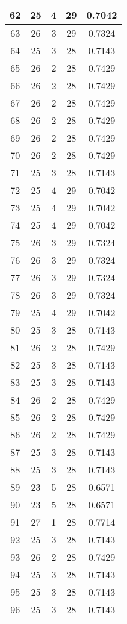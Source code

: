 \documentclass[letterpaper, 12pt]{article}
\begin{document}
\begin{longtable}{|c|c|c|c|c|}
\hline
62 & 25 & 4 & 29 & 0.7042 \\
\hline
63 & 26 & 3 & 29 & 0.7324 \\
\hline
64 & 25 & 3 & 28 & 0.7143 \\
\hline
65 & 26 & 2 & 28 & 0.7429 \\
\hline
66 & 26 & 2 & 28 & 0.7429 \\
\hline
67 & 26 & 2 & 28 & 0.7429 \\
\hline
68 & 26 & 2 & 28 & 0.7429 \\
\hline
69 & 26 & 2 & 28 & 0.7429 \\
\hline
70 & 26 & 2 & 28 & 0.7429 \\
\hline
71 & 25 & 3 & 28 & 0.7143 \\
\hline
72 & 25 & 4 & 29 & 0.7042 \\
\hline
73 & 25 & 4 & 29 & 0.7042 \\
\hline
74 & 25 & 4 & 29 & 0.7042 \\
\hline
75 & 26 & 3 & 29 & 0.7324 \\
\hline
76 & 26 & 3 & 29 & 0.7324 \\
\hline
77 & 26 & 3 & 29 & 0.7324 \\
\hline
78 & 26 & 3 & 29 & 0.7324 \\
\hline
79 & 25 & 4 & 29 & 0.7042 \\
\hline
80 & 25 & 3 & 28 & 0.7143 \\
\hline
81 & 26 & 2 & 28 & 0.7429 \\
\hline
82 & 25 & 3 & 28 & 0.7143 \\
\hline
83 & 25 & 3 & 28 & 0.7143 \\
\hline
84 & 26 & 2 & 28 & 0.7429 \\
\hline
85 & 26 & 2 & 28 & 0.7429 \\
\hline
86 & 26 & 2 & 28 & 0.7429 \\
\hline
87 & 25 & 3 & 28 & 0.7143 \\
\hline
88 & 25 & 3 & 28 & 0.7143 \\
\hline
89 & 23 & 5 & 28 & 0.6571 \\
\hline
90 & 23 & 5 & 28 & 0.6571 \\
\hline
91 & 27 & 1 & 28 & 0.7714 \\
\hline
92 & 25 & 3 & 28 & 0.7143 \\
\hline
93 & 26 & 2 & 28 & 0.7429 \\
\hline
94 & 25 & 3 & 28 & 0.7143 \\
\hline
95 & 25 & 3 & 28 & 0.7143 \\
\hline
96 & 25 & 3 & 28 & 0.7143 \\

\end{longtable}
\end{document}
